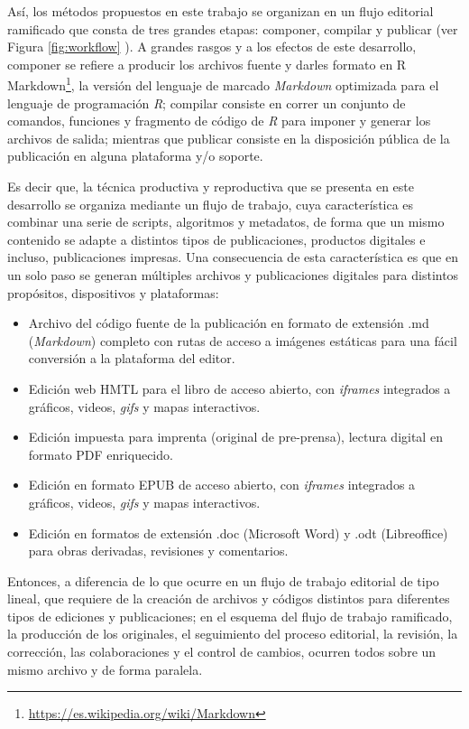 \documentclass[
]{krantz}
\DeclareRobustCommand{\href}[2]{#2\footnote{\url{#1}}}
\providecommand{\tightlist}{%
  \setlength{\itemsep}{0pt}\setlength{\parskip}{0pt}}
\begin{document}
Así, los métodos propuestos en este trabajo se organizan en un flujo editorial ramificado \citep{ramiroEdicionDigitalComo2018} que consta de tres grandes etapas: componer, compilar y publicar (ver Figura \ref{fig:workflow} ). A grandes rasgos y a los efectos de este desarrollo, componer se refiere a producir los archivos fuente y darles formato en R \href{https://es.wikipedia.org/wiki/Markdown}{Markdown}, la versión del lenguaje de marcado \emph{Markdown} optimizada para el lenguaje de programación \emph{R}; compilar consiste en correr un conjunto de comandos, funciones y fragmento de código de \emph{R} para imponer y generar los archivos de salida; mientras que publicar consiste en la disposición pública de la publicación en alguna plataforma y/o soporte.

Es decir que, la técnica productiva y reproductiva \citep{seminariopublicacionesdigitalesUnidadParte2021} que se presenta en este desarrollo se organiza mediante un flujo de trabajo, cuya característica es combinar una serie de scripts, algoritmos y metadatos, de forma que un mismo contenido se adapte a distintos tipos de publicaciones, productos digitales e incluso, publicaciones impresas. Una consecuencia de esta característica es que en un solo paso se generan múltiples archivos y publicaciones digitales para distintos propósitos, dispositivos y plataformas:

\begin{itemize}
\tightlist
\item
  Archivo del código fuente de la publicación en formato de extensión .md (\emph{Markdown}) completo con rutas de acceso a imágenes estáticas para una fácil conversión a la plataforma del editor.
\item
  Edición web HMTL para el libro de acceso abierto, con \emph{iframes} integrados a gráficos, videos, \emph{gifs} y mapas interactivos.
\item
  Edición impuesta para imprenta (original de pre-prensa), lectura digital en formato PDF enriquecido.
\item
  Edición en formato EPUB de acceso abierto, con \emph{iframes} integrados a gráficos, videos, \emph{gifs} y mapas interactivos.
\item
  Edición en formatos de extensión .doc (Microsoft Word) y .odt (Libreoffice) para obras derivadas, revisiones y comentarios.
\end{itemize}

Entonces, a diferencia de lo que ocurre en un flujo de trabajo editorial de tipo lineal, que requiere de la creación de archivos y códigos distintos para diferentes tipos de ediciones y publicaciones; en el esquema del flujo de trabajo ramificado, la producción de los originales, el seguimiento del proceso editorial, la revisión, la corrección, las colaboraciones y el control de cambios, ocurren todos sobre un mismo archivo y de forma paralela.
\end{document}
